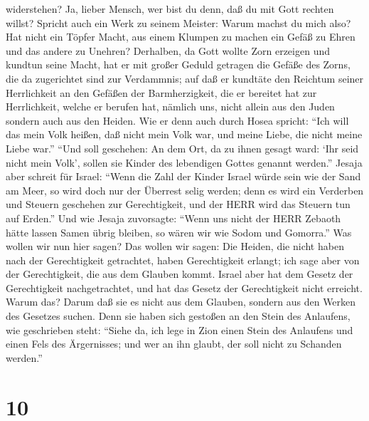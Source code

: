 widerstehen?  Ja, lieber Mensch, wer bist du denn, daß du
mit Gott rechten willst? Spricht auch ein Werk zu seinem Meister: Warum
machst du mich also?  Hat nicht ein Töpfer Macht, aus einem
Klumpen zu machen ein Gefäß zu Ehren und das andere zu Unehren?
 Derhalben, da Gott wollte Zorn erzeigen und kundtun seine
Macht, hat er mit großer Geduld getragen die Gefäße des Zorns, die da
zugerichtet sind zur Verdammnis;  auf daß er kundtäte den
Reichtum seiner Herrlichkeit an den Gefäßen der Barmherzigkeit, die er
bereitet hat zur Herrlichkeit,  welche er berufen hat,
nämlich uns, nicht allein aus den Juden sondern auch aus den Heiden.
 Wie er denn auch durch Hosea spricht: ``Ich will das mein
Volk heißen, daß nicht mein Volk war, und meine Liebe, die nicht meine
Liebe war.''  ``Und soll geschehen: An dem Ort, da zu ihnen
gesagt ward: `Ihr seid nicht mein Volk', sollen sie Kinder des
lebendigen Gottes genannt werden.''  Jesaja aber schreit
für Israel: ``Wenn die Zahl der Kinder Israel würde sein wie der Sand am
Meer, so wird doch nur der Überrest selig werden;  denn es
wird ein Verderben und Steuern geschehen zur Gerechtigkeit, und der HERR
wird das Steuern tun auf Erden.''  Und wie Jesaja
zuvorsagte: ``Wenn uns nicht der HERR Zebaoth hätte lassen Samen übrig
bleiben, so wären wir wie Sodom und Gomorra.''  Was wollen
wir nun hier sagen? Das wollen wir sagen: Die Heiden, die nicht haben
nach der Gerechtigkeit getrachtet, haben Gerechtigkeit erlangt; ich sage
aber von der Gerechtigkeit, die aus dem Glauben kommt. 
Israel aber hat dem Gesetz der Gerechtigkeit nachgetrachtet, und hat das
Gesetz der Gerechtigkeit nicht erreicht.  Warum das? Darum
daß sie es nicht aus dem Glauben, sondern aus den Werken des Gesetzes
suchen. Denn sie haben sich gestoßen an den Stein des Anlaufens,
 wie geschrieben steht: ``Siehe da, ich lege in Zion einen
Stein des Anlaufens und einen Fels des Ärgernisses; und wer an ihn
glaubt, der soll nicht zu Schanden werden.''

\hypertarget{section-9}{%
\section{10}\label{section-9}}

